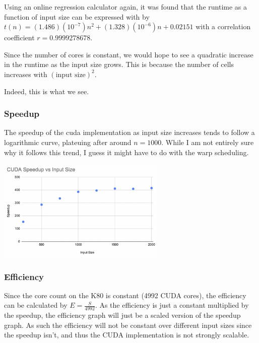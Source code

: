 \documentclass[11pt]{article}
\begin{document}
Using an online regression calculator again, it was found that the runtime as a function of input size can be expressed with by \(t(n) = (1.486)(10^{-7})n^2 + (1.328)(10^{-6})n + 0.02151\) with a correlation coefficient \(r = 0.9999278678\).

Since the number of cores is constant, we would hope to see a quadratic increase in the runtime as the input size grows. This is because the number of cells increases with \((\text{input size})^2\).

Indeed, this is what we see.

\subsubsection{Speedup}
\label{sec:org888d520}
The speedup of the cuda implementation as input size increases tends to follow a logarithmic curve, plateuing after around \(n=1000\). While I am not entirely sure why it follows this trend, I guess it might have to do with the warp scheduling.

\begin{center}
\includegraphics[width=8cm]{./cuda-speedup.png}
\end{center}

\subsubsection{Efficiency}
\label{sec:org530b4aa}
Since the core count on the K80 is constant (4992 CUDA cores), the efficiency can be calculated by \(E = \frac{S}{4992}\). As the efficiency is just a constant multiplied by the speedup, the efficiency graph will just be a scaled version of the speedup graph. As such the efficiency will not be constant over different input sizes since the speedup isn't, and thus the CUDA implementation is not strongly scalable.
\end{document}
